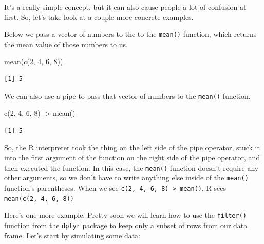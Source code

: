 \documentclass[
  letterpaper,
  DIV=11,
  numbers=noendperiod]{scrreprt}
\newenvironment{Shaded}{\begin{snugshade}}{\end{snugshade}}
\newcommand{\DecValTok}[1]{\textcolor[rgb]{0.68,0.00,0.00}{#1}}
\newcommand{\FunctionTok}[1]{\textcolor[rgb]{0.28,0.35,0.67}{#1}}
\newcommand{\NormalTok}[1]{\textcolor[rgb]{0.00,0.23,0.31}{#1}}
\newcommand{\SpecialCharTok}[1]{\textcolor[rgb]{0.37,0.37,0.37}{#1}}
\begin{document}
It's a really simple concept, but it can also cause people a lot of
confusion at first. So, let's take look at a couple more concrete
examples.

Below we pass a vector of numbers to the to the \texttt{mean()}
function, which returns the mean value of those numbers to us.

\begin{Shaded}
\begin{Highlighting}[]
\FunctionTok{mean}\NormalTok{(}\FunctionTok{c}\NormalTok{(}\DecValTok{2}\NormalTok{, }\DecValTok{4}\NormalTok{, }\DecValTok{6}\NormalTok{, }\DecValTok{8}\NormalTok{))}
\end{Highlighting}
\end{Shaded}

\begin{verbatim}
[1] 5
\end{verbatim}

We can also use a pipe to pass that vector of numbers to the
\texttt{mean()} function.

\begin{Shaded}
\begin{Highlighting}[]
\FunctionTok{c}\NormalTok{(}\DecValTok{2}\NormalTok{, }\DecValTok{4}\NormalTok{, }\DecValTok{6}\NormalTok{, }\DecValTok{8}\NormalTok{) }\SpecialCharTok{|\textgreater{}} \FunctionTok{mean}\NormalTok{()}
\end{Highlighting}
\end{Shaded}

\begin{verbatim}
[1] 5
\end{verbatim}

So, the R interpreter took the thing on the left side of the pipe
operator, stuck it into the first argument of the function on the right
side of the pipe operator, and then executed the function. In this case,
the \texttt{mean()} function doesn't require any other arguments, so we
don't have to write anything else inside of the \texttt{mean()}
function's parentheses. When we see
\texttt{c(2,\ 4,\ 6,\ 8)\ \textbar{}\textgreater{}\ mean()}, R sees
\texttt{mean(c(2,\ 4,\ 6,\ 8))}

Here's one more example. Pretty soon we will learn how to use the
\texttt{filter()} function from the \texttt{dplyr} package to keep only
a subset of rows from our data frame. Let's start by simulating some
data:
\end{document}
